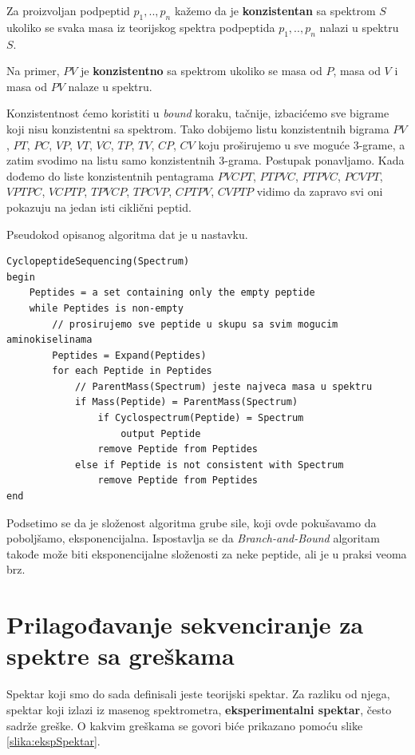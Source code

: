 \begin{definicija}
Za proizvoljan podpeptid $p_{1},..,p_{n}$ kažemo da je \textbf{konzistentan} sa spektrom $S$ ukoliko se svaka masa iz teorijskog spektra podpeptida  $p_{1},..,p_{n}$ nalazi u spektru $S$.
\end{definicija}

Na primer, $PV$ je \textbf{konzistentno} sa spektrom ukoliko se masa od $P$, masa od $V$ i masa od $PV$ nalaze u spektru.

Konzistentnost ćemo koristiti u \textit{bound} koraku, tačnije, izbacićemo sve bigrame koji nisu konzistentni sa spektrom. Tako dobijemo listu konzistentnih bigrama $PV$, $PT$, $PC$, $VP$, $VT$, $VC$, $TP$, $TV$, $CP$, $CV$ koju proširujemo u sve moguće $3$-grame, a zatim svodimo na listu samo konzistentnih $3$-grama. Postupak ponavljamo. Kada dođemo do liste konzistentnih pentagrama $PVCPT$, $PTPVC$, $PTPVC$, $PCVPT$, $VPTPC$, $VCPTP$, $TPVCP$, $TPCVP$, $CPTPV$, $CVPTP$ vidimo da zapravo svi oni pokazuju na jedan isti ciklični peptid.

Pseudokod opisanog algoritma dat je u nastavku.
\begin{lstlisting}
CyclopeptideSequencing(Spectrum)
begin
	Peptides = a set containing only the empty peptide
	while Peptides is non-empty
		// prosirujemo sve peptide u skupu sa svim mogucim aminokiselinama
		Peptides = Expand(Peptides)
		for each Peptide in Peptides
			// ParentMass(Spectrum) jeste najveca masa u spektru
			if Mass(Peptide) = ParentMass(Spectrum)
				if Cyclospectrum(Peptide) = Spectrum
					output Peptide
				remove Peptide from Peptides
			else if Peptide is not consistent with Spectrum
				remove Peptide from Peptides
end
\end{lstlisting}

Podsetimo se da je složenost algoritma grube sile, koji ovde pokušavamo da poboljšamo, eksponencijalna. Ispostavlja se da \textit{Branch-and-Bound} algoritam takođe može biti eksponencijalne složenosti za neke peptide, ali je u praksi veoma brz.



\section{Prilagođavanje sekvenciranje za spektre sa greškama} \label{greskeSpektri}

Spektar koji smo do sada definisali jeste teorijski spektar. Za razliku od njega, spektar koji izlazi iz masenog spektrometra, \textbf{eksperimentalni spektar}, često sadrže greške. O kakvim greškama se govori biće prikazano pomoću slike \ref{slika:ekspSpektar}.

